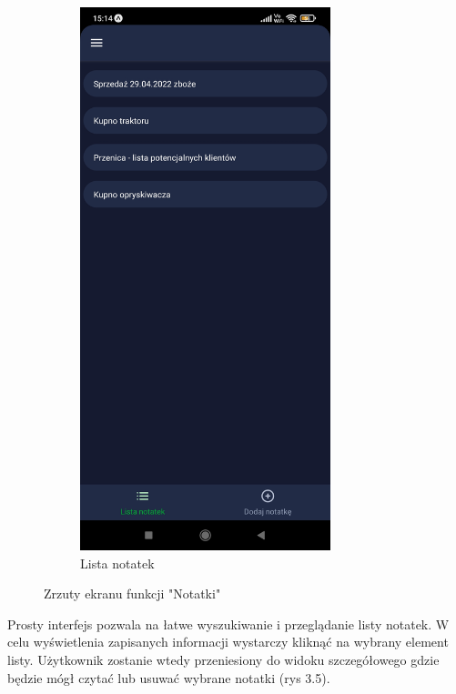 \documentclass[a4paper,12pt,oneside]{book}
\begin{document}
\begin{figure}[H]
\begin{subfigure}{.5\textwidth}
			\includegraphics[width=0.8\textwidth]{grafika/notatki_b.jpg}
			\caption{Lista notatek}
		\end{subfigure}
		\caption{Zrzuty ekranu funkcji "Notatki"}
	\end{figure}
	
	Prosty interfejs pozwala na łatwe wyszukiwanie i przeglądanie listy notatek. W celu wyświetlenia zapisanych informacji wystarczy kliknąć na wybrany element listy. Użytkownik zostanie wtedy przeniesiony do widoku szczegółowego gdzie będzie mógł czytać lub usuwać wybrane notatki (rys 3.5).
	
\end{document}
